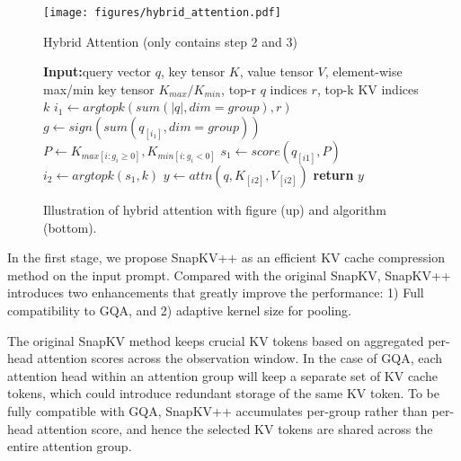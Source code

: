 \begin{figure*}[!ht]
  \centering
  \parbox{0.9\textwidth}{
    \centering
\texttt{[image: figures/hybrid\_attention.pdf]}
    \label{fig:hybridkv}
  }
  \hspace{0.05\textwidth} %
  \parbox{0.45\textwidth}{
    \centering
    \begin{algorithm}[H]
      \caption{Hybrid Attention (only contains step 2 and 3)}
      \label{alg:hybrid}
      \begin{algorithmic}%
        \STATE \textbf{Input:}{query vector $q$, key tensor $K$, value tensor $V$, element-wise max/min key tensor $K_{max}/K_{min}$, top-r $q$ indices $r$, top-k KV indices $k$}
        \STATE $i_1 \gets argtopk(sum(|q|, dim=group), r)$
        \STATE $g \gets sign(sum(q_{[i_1]}, dim=group))$
        \STATE $P \gets K_{max[i:g_i \geq 0]}, K_{min[i:g_i < 0]}$
        \STATE $s_1 \gets score(q_{[i1]}, P)$   
        \STATE $i_2 \gets argtopk(s_1, k)$
        \STATE $y \gets attn(q, K_{[i2]}, V_{[i2]})$ 
        \STATE \textbf{return} $y$
      \end{algorithmic} 
    \end{algorithm}
  }
  \caption{Illustration of hybrid attention with figure (up) and algorithm (bottom).}
  \label{fig:hybridatt}
\end{figure*}



In the first stage, we propose SnapKV++ as an efficient KV cache compression method on the input prompt. Compared with the original SnapKV, SnapKV++ introduces two enhancements that greatly improve the performance: 1) Full compatibility to GQA, and 2) adaptive kernel size for pooling.

The original SnapKV method keeps crucial KV tokens based on aggregated per-head attention scores across the observation window. In the case of GQA, each attention head within an attention group will keep a separate set of KV cache tokens, which could introduce redundant storage of the same KV token. To be fully compatible with GQA, SnapKV++ accumulates per-group rather than per-head attention score, and hence the selected KV tokens are shared across the entire attention group. 

